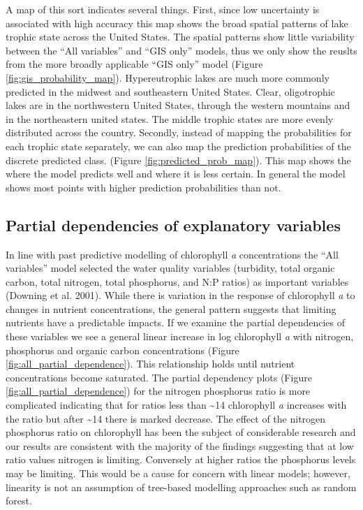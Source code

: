 \documentclass[11pt,]{article}
\begin{document}
A map of this sort indicates several things. First, since low
uncertainty is associated with high accuracy this map shows the broad
spatial patterns of lake trophic state across the United States. The
spatial patterns show little variability between the ``All variables''
and ``GIS only'' models, thus we only show the reuslts from the more
broadly applicable ``GIS only'' model (Figure
\ref{fig:gis_probability_map}). Hypereutrophic lakes are much more
commonly predicted in the midwest and southeastern United States. Clear,
oligotrophic lakes are in the northwestern United States, through the
western mountains and in the northeastern united states. The middle
trophic states are more evenly distributed across the country. Secondly,
instead of mapping the probabilities for each trophic state separately,
we can also map the prediction probabilities of the discrete predicted
class. (Figure \ref{fig:predicted_prob_map}). This map shows the where
the model predicts well and where it is less certain. In general the
model shows most points with higher prediction probabilities than not.

\subsection{Partial dependencies of explanatory
variables}\label{partial-dependencies-of-explanatory-variables}

In line with past predictive modelling of chlorophyll \emph{a}
concentrations the ``All variables'' model selected the water quality
variables (turbidity, total organic carbon, total nitrogen, total
phosphorus, and N:P ratios) as important variables (Downing et al.
2001). While there is variation in the response of chlorophyll \emph{a}
to changes in nutrient concentrations, the general pattern suggests that
limiting nutrients have a predictable impacts. If we examine the partial
dependencies of these variables we see a general linear increase in log
chlorophyll \emph{a} with nitrogen, phosphorus and organic carbon
concentrations (Figure \ref{fig:all_partial_dependence}). This
relationship holds until nutrient concentrations become saturated. The
partial dependency plots (Figure \ref{fig:all_partial_dependence}) for
the nitrogen phosphorus ratio is more complicated indicating that for
ratios less than \textasciitilde{}14 chlorophyll \emph{a} increases with
the ratio but after \textasciitilde{}14 there is marked decrease. The
effect of the nitrogen phosphorus ratio on chlorophyll has been the
subject of considerable research and our results are consistent with the
majority of the findings suggesting that at low ratio values nitrogen is
limiting. Conversely at higher ratios the phosphorus levels may be
limiting. This would be a cause for concern with linear models; however,
linearity is not an assumption of tree-based modelling approaches such
as random forest.
\end{document}
